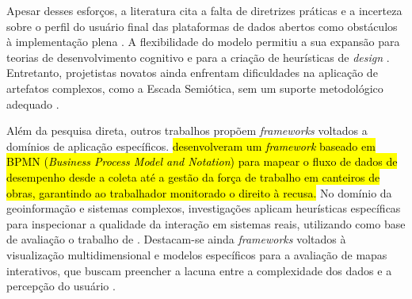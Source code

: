 \documentclass[
	12pt,				%
	oneside,			%
	a4paper,			%
	english,			%
	brazil				%
	]{abntex2ppgsi}
\newcommand{\hlciteonline}[1]{\colorbox{yellow}{\citeonline{#1}}} %
\begin{document}
    Apesar desses esforços, a literatura cita a falta de diretrizes práticas e a incerteza sobre o perfil do usuário final das plataformas de dados abertos como obstáculos à implementação plena \cite{Belizario2023Interacao}. A flexibilidade do modelo permitiu a sua expansão para teorias de desenvolvimento cognitivo e para a criação de heurísticas de \textit{design} \cite{Elhamdadi2022, Bartram2022, chalhoub2024useful}. Entretanto, projetistas novatos ainda enfrentam dificuldades na aplicação de artefatos complexos, como a Escada Semiótica, sem um suporte metodológico adequado \cite{Strey2019Human}.

    Além da pesquisa direta, outros trabalhos propõem \textit{frameworks} voltados a domínios de aplicação específicos. \hlciteonline{Calvetti2021173} \hl{desenvolveram um \textit{framework} baseado em BPMN (\textit{Business Process Model and Notation}) para mapear o fluxo de dados de desempenho desde a coleta até a gestão da força de trabalho em canteiros de obras, garantindo ao trabalhador monitorado o direito à recusa.} No domínio da geoinformação e sistemas complexos, investigações aplicam heurísticas específicas para inspecionar a qualidade da interação em sistemas reais, utilizando como base de avaliação o trabalho de  \cite{Capeleti2024Human}. Destacam-se ainda \textit{frameworks} voltados à visualização multidimensional e modelos específicos para a avaliação de mapas interativos, que buscam preencher a lacuna entre a complexidade dos dados e a percepção do usuário \cite{Capeleti2024Human}.
\end{document}
